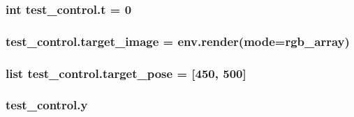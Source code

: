 \subsubsection[{\texorpdfstring{t}{t}}]{\setlength{\rightskip}{0pt plus 5cm}int test\+\_\+control.\+t = 0}\hypertarget{namespacetest__control_a1bb0f0b642b4210d5e9d01cf8928da82}{}\label{namespacetest__control_a1bb0f0b642b4210d5e9d01cf8928da82}
\subsubsection[{\texorpdfstring{target\+\_\+image}{target_image}}]{\setlength{\rightskip}{0pt plus 5cm}test\+\_\+control.\+target\+\_\+image = env.\+render(mode=\textquotesingle{}rgb\+\_\+array\textquotesingle{})}\hypertarget{namespacetest__control_aebc61fa5fbcc4639b31cb9c4b9e33a17}{}\label{namespacetest__control_aebc61fa5fbcc4639b31cb9c4b9e33a17}
\subsubsection[{\texorpdfstring{target\+\_\+pose}{target_pose}}]{\setlength{\rightskip}{0pt plus 5cm}list test\+\_\+control.\+target\+\_\+pose = \mbox{[}450, 500\mbox{]}}\hypertarget{namespacetest__control_acab1d8f94fdfa116b9180b0d82693741}{}\label{namespacetest__control_acab1d8f94fdfa116b9180b0d82693741}
\subsubsection[{\texorpdfstring{y}{y}}]{\setlength{\rightskip}{0pt plus 5cm}test\+\_\+control.\+y}\hypertarget{namespacetest__control_a127d50b0c4ee9b0c1af9af28c06195cb}{}\label{namespacetest__control_a127d50b0c4ee9b0c1af9af28c06195cb}
